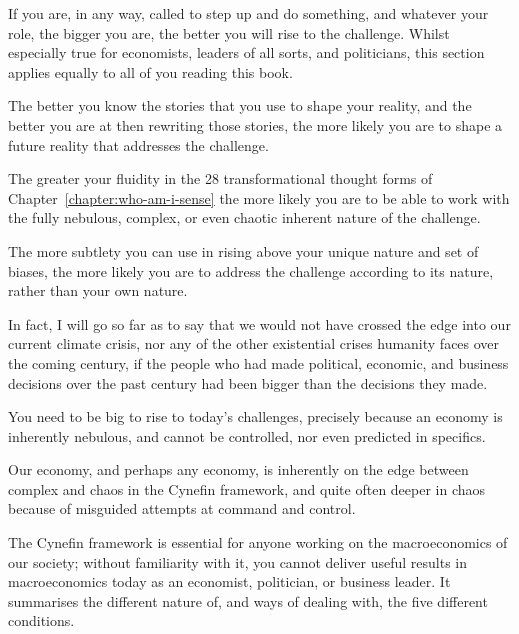 If you are, in any way, called to step up and do something, and whatever your role, the bigger you are, the better you will rise to the challenge. Whilst especially true for economists, leaders of all sorts, and politicians, this section applies equally to all of you reading this book.


The better you know the stories that you use to shape your reality, and the better you are at then rewriting those stories, the more likely you are to shape a future reality that addresses the challenge.


The greater your fluidity in the 28 transformational thought forms of Chap\-ter~\ref{chapter:who-am-i-sense} the more likely you are to be able to work with the fully nebulous, complex, or even chaotic inherent nature of the challenge.


The more subtlety you can use in rising above your unique nature and set of biases, the more likely you are to address the challenge according to its nature, rather than your own nature.


In fact, I will go so far as to say that we would not have crossed the edge into our current climate crisis, nor any of the other existential crises humanity faces over the coming century, if the people who had made political, economic, and business decisions over the past century had been bigger than the decisions they made.


You need to be big to rise to today's challenges, precisely because an economy is inherently nebulous, and cannot be controlled, nor even predicted in specifics. 


Our economy, and perhaps any economy, is inherently on the edge between complex and chaos in the Cynefin framework\cite{snowden-cynefin, cynefin}, and quite often deeper in chaos because of misguided attempts at command and control. 


The Cynefin framework is essential for anyone working on the macroeconomics of our society; without familiarity with it, you cannot deliver useful results in macroeconomics today as an economist, politician, or business leader. It summarises the different nature of, and ways of dealing with, the five different conditions.



